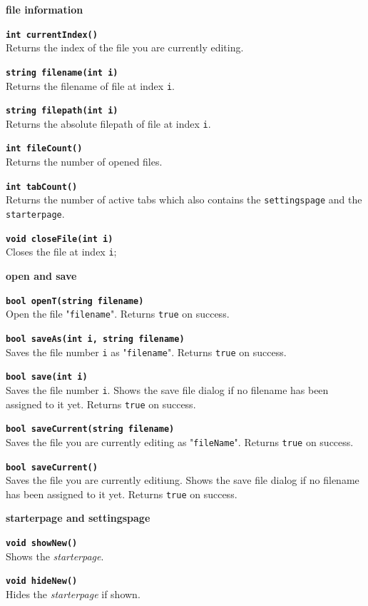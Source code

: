 \begin{trivlist}
	\item[]\textbf{file information}
	\begin{trivlist}
		\leftskip=1cm
		\item[]\textbf{\texttt{int currentIndex()}}\\ Returns the index of the file you are currently editing.
		\item[]\textbf{\texttt{string filename(int i)}}\\ Returns the filename of file at index \texttt{i}.
		\item[]\textbf{\texttt{string filepath(int i)}}\\ Returns the absolute filepath of file at index \texttt{i}.
		\item[]\textbf{\texttt{int fileCount()}}\\ Returns the number of opened files.
		\item[]\textbf{\texttt{int tabCount()}}\\ Returns the number of active tabs which also contains the \texttt{settingspage} and the \texttt{starterpage}.
		\item[]\textbf{\texttt{void closeFile(int i)}}\\ Closes the file at index \texttt{i};
	\end{trivlist}
	\item[]\textbf{open and save}
	\begin{trivlist}
		\leftskip=1cm
		\item[]\textbf{\texttt{bool openT(string filename)}}\\ Open the file "\texttt{filename}". Returns \texttt{true} on success.
		\item[]\textbf{\texttt{bool saveAs(int i, string filename)}}\\ Saves the file number \texttt{i} as "\texttt{filename}". Returns \texttt{true} on success.
		\item[]\textbf{\texttt{bool save(int i)}}\\ Saves the file number \texttt{i}. Shows the save file dialog if no filename has been assigned to it yet. Returns \texttt{true} on success.
		\item[]\textbf{\texttt{bool saveCurrent(string filename)}}\\ Saves the file you are currently editing as "\texttt{fileName}". Returns \texttt{true} on success.
		\item[]\textbf{\texttt{bool saveCurrent()}}\\ Saves the file you are currently editiung. Shows the save file dialog if no filename has been assigned to it yet. Returns \texttt{true} on success.
	\end{trivlist}
	\item[]\textbf{starterpage and settingspage}
	\begin{trivlist}
		\leftskip=1cm
		\item[]\textbf{\texttt{void showNew()}}\\ Shows the \textit{starterpage}.
		\item[]\textbf{\texttt{void hideNew()}}\\ Hides the \textit{starterpage} if shown.


\end{trivlist}
\end{trivlist}
